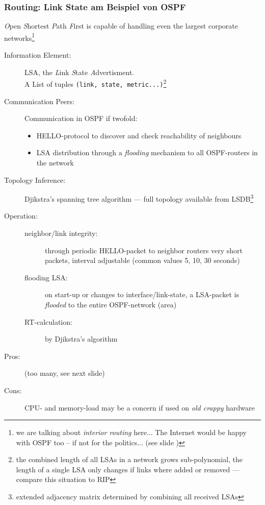\documentclass[ignorenonframetext]{beamer}
\begin{document}
\begin{frame}
\frametitle{Routing: Link State am Beispiel von OSPF}
{\em O}pen {\em S}hortest {\em P}ath {\em F}irst is
capable of handling even the largest corporate networks\footnote{we
are talking about {\em interior routing} here... The Internet
would be happy with OSPF too -- if not for the politics... (see slide \pageref{BGP})}
\begin{small}
\begin{description}
	\item[Information Element:] LSA, the {\em L}ink {\em S}tate {\em A}dvertisment.\\A List
		of tuples {\tt (link, state, metric...)}\footnote{the combined length of all LSAs
		in a network grows sub-polynomial, the length of a single LSA only changes
		if links where added or removed --- compare this situation to RIP}
	\item[Communication Peers:] Communication in OSPF if twofold:\begin{tiny}
		\begin{itemize}
			\item HELLO-protocol to discover and check reachability of neighbours
			\item LSA distribution through a {\em flooding} mechanism to all OSPF-routers in the network
		\end{itemize}\end{tiny}
	\item[Topology Inference:] Djikstra's spanning tree algorithm --- full topology available
		from LSDB\footnote{extended adjacency matrix determined by combining all received LSAs}
	\item[Operation:] \begin{tiny}
		\begin{description}
			\item[neighbor/link integrity:] through periodic HELLO-packet to neighbor routers {\tiny very
				short packets, interval adjustable (common values 5, 10, 30 seconds)}
			\item[flooding LSA:] on start-up or changes to interface/link-state, a LSA-packet is \emph{flooded}
				to the entire OSPF-network (area)
			\item[RT-calculation:] by Djikstra's algorithm
		\end{description}\end{tiny}
	\item[Pros:] (too many, see next slide)
	\item[Cons:] CPU- and memory-load may be a concern if used on {\em old crappy} hardware
\end{description}
\end{small}
\end{frame}
\end{document}
